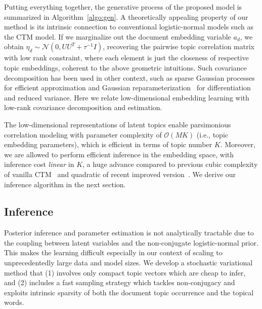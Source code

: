 \documentclass[sigconf]{acmart}
\renewcommand*{\bm}[1]{#1}%
\begin{document}
Putting everything together, the generative process of the proposed model is summarized in Algorithm~\ref{algo:gen}. A theoretically appealing property of our method is its intrinsic connection to conventional logistic-normal models such as the CTM model. If we marginalize out the document embedding variable $\bm{a}_d$, we obtain $\bm{\eta}_d \sim \mathcal{N}(\bm{0}, \bm{U}\bm{U}^{T}+\tau^{-1}\bm{I})$, recovering the pairwise topic correlation matrix with low rank constraint, where each element is just the closeness of respective topic embeddings, coherent to the above geometric intuitions. Such covariance decomposition has been used in other context, such as sparse Gaussian processes~\cite{titsias2009variational} for efficient approximation and Gaussian reparameterization~\cite{kingma2013auto,wilson2016stochastic} for differentiation and reduced variance. Here we relate low-dimensional embedding learning with low-rank covariance decomposition and estimation.

The low-dimensional representations of latent topics enable parsimonious correlation modeling with parameter complexity of $\mathcal{O}(MK)$ (i.e., topic embedding parameters), which is efficient in terms of topic number $K$. Moreover, we are allowed to perform efficient inference in the embedding space, with inference cost {\it linear} in $K$, a huge advance compared to previous cubic complexity of vanilla CTM~\cite{blei2007correlated} and quadratic of recent improved version~\cite{chen2013scalable}. We derive our inference algorithm in the next section.

\subsection{Inference}\label{sec:infer} 
Posterior inference and parameter estimation is not analytically tractable due to the coupling between latent variables and the non-conjugate logistic-normal prior. This makes the learning difficult especially in our context of scaling to unprecedentedly large data and model sizes.
We develop a stochastic variational method that (1) involves only compact topic vectors which are cheap to infer, and (2) includes a fast sampling strategy which tackles non-conjugacy and exploits intrinsic sparsity of both the document topic occurrence and the topical words.
\end{document}

